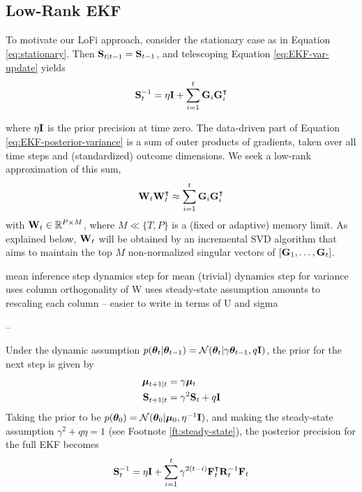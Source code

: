 \subsection{Low-Rank EKF}

To motivate our LoFi approach, consider the stationary case as in Equation \eqref{eq:stationary}. Then $\mathbf{S}_{t|t-1} = \mathbf{S}_{t-1}$, and telescoping Equation \eqref{eq:EKF-var-update} yields
\begin{align}
    \mathbf{S}_t^{-1} = \eta\mathbf{I} + \sum_{i=1}^t \mathbf{G}_i\mathbf{G}_i^\intercal \label{eq:EKF-posterior-variance}
\end{align}

where $\eta\mathbf{I}$ is the prior precision at time zero. The data-driven part of Equation \eqref{eq:EKF-posterior-variance} is a sum of outer products of gradients, taken over all time steps and (standardized) outcome dimensions. We seek a low-rank approximation of this sum,
\begin{align}
    \mathbf{W}_t\mathbf{W}_t^\intercal \approx \sum_{i=1}^t \mathbf{G}_i\mathbf{G}_i^\intercal
\end{align}
with $\mathbf{W}_t\in\mathbb{R}^{P\times M}$, where $M\ll\{T,P\}$ is a (fixed or adaptive) memory limit. As explained below, $\mathbf{W}_t$ will be obtained by an incremental SVD algorithm that aims to maintain the top $M$ non-normalized singular vectors of $[\mathbf{G}_1,\dots,\mathbf{G}_t]$.

mean inference step
dynamics step for mean (trivial)
dynamics step for variance
 uses column orthogonality of W
 uses steady-state assumption
 amounts to rescaling each column -- easier to write in terms of U and sigma

--

Under the dynamic assumption $p({\bm{\theta}}_t\vert{\bm{\theta}}_{t-1})=\mathcal{N}({\bm{\theta}}_t|\gamma{\bm{\theta}}_{t-1},q\mathbf{I})$, the prior for the next step is given by
\begin{align}
    \boldsymbol{\mu}_{t+1|t} &= \gamma\boldsymbol{\mu}_t \\
    \mathbf{S}_{t+1|t} &= \gamma^2\mathbf{S}_t + q\mathbf{I}
\end{align}
Taking the prior to be $p({\bm{\theta}}_0)=\mathcal{N}({\bm{\theta}}_0|\boldsymbol{\mu}_0,\eta^{-1}\mathbf{I})$, and making the steady-state assumption $\gamma^2 + q\eta = 1$ (see Footnote \ref{ft:steady-state}), the posterior precision for the full EKF becomes
\begin{align}
    \mathbf{S}_t^{-1} = \eta\mathbf{I} + \sum_{i=1}^t \gamma^{2(t-i)}\mathbf{F}_t^\intercal \mathbf{R}_t^{-1}\mathbf{F}_t
\end{align}

